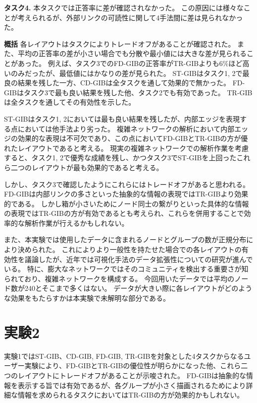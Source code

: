 \documentclass{kuee}
\begin{document}
{\bf タスク4.} 本タスクでは正答率に差が確認されなかった。
この原因には様々なことが考えられるが、外部リンクの可読性に関して4手法間に差は見られなかった。

{\bf 概括} 各レイアウトはタスクによりトレードオフがあることが確認された。
また、平均の正答率の差が小さい場合でも分散や最小値には大きな差が見られることがあった。
例えば、タスク3でのFD-GIBの正答率がTR-GIBよりも6\%ほど高いのみだったが、最低値にはかなりの差が見られた。
ST-GIBはタスク1, 2で最良の結果を残した一方、CD-GIBは全タスクを通して効果的で無かった。
FD-GIBはタスク3で最も良い結果を残した他、タスク2でも有効であった。
TR-GIBは全タスクを通してその有効性を示した。

ST-GIBはタスク1, 2においては最も良い結果を残したが、内部エッジを表現する点においては他手法より劣った。
複雑ネットワークの解析において内部エッジの効果的な表現は不可欠であり、この点においてFD-GIBとTR-GIBの方が優れたレイアウトであると考える。
現実の複雑ネットワークでの解析作業を考慮すると、タスク1, 2で優秀な成績を残し、かつタスク3でST-GIBを上回ったこれら二つのレイアウトが最も効果的であると考える。

しかし、タスク3で確認したようにこれらにはトレードオフがあると思われる。
FD-GIBは内部リンクの多さといった抽象的な情報の表現ではTR-GIBより効果的である。
しかし箱が小さいためにノード同士の繋がりといった具体的な情報の表現ではTR-GIBの方が有効であるとも考えられ、これらを併用することで効率的な解析作業が行えるかもしれない。

また、本実験では使用したデータに含まれるノードとグループの数が正規分布により決められた。
これによりより一般性を持たせた場合での各レイアウトの有効性を議論したが、近年では可視化手法のデータ拡張性についての研究が進んでいる。
特に、膨大なネットワークではそのコミュニティを検出する重要さが知られており、複雑ネットワークを構成する。
今回用いたデータでは平均のノード数が240とそこまで多くはない。
データが大きい際に各レイアウトがどのような効果をもたらすかは本実験で未解明な部分である。

\chapter{実験2}
\label{chap:ex_2}

実験1ではST-GIB、CD-GIB, FD-GIB, TR-GIBを対象とした4タスクからなるユーザー実験により、FD-GIBとTR-GIBの優位性が明らかになった他、これら二つのレイアウトにトレードオフがあることが示唆された。
FD-GIBは抽象的な情報を表示する旨では有効であるが、各グループが小さく描画されるためにより詳細な情報を求められるタスクにおいてはTR-GIBの方が効果的かもしれない。
\end{document}
